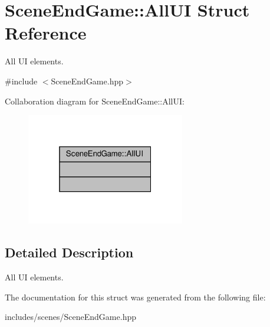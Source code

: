 \hypertarget{struct_scene_end_game_1_1_all_u_i}{}\section{Scene\+End\+Game\+:\+:All\+UI Struct Reference}
\label{struct_scene_end_game_1_1_all_u_i}


All UI elements.  




{\ttfamily \#include $<$Scene\+End\+Game.\+hpp$>$}



Collaboration diagram for Scene\+End\+Game\+:\+:All\+UI\+:
\nopagebreak
\begin{figure}[H]
\begin{center}
\leavevmode
\includegraphics[width=196pt]{struct_scene_end_game_1_1_all_u_i__coll__graph}
\end{center}
\end{figure}


\subsection{Detailed Description}
All UI elements. 

The documentation for this struct was generated from the following file\+:\begin{DoxyCompactItemize}
\item 
includes/scenes/Scene\+End\+Game.\+hpp\end{DoxyCompactItemize}
